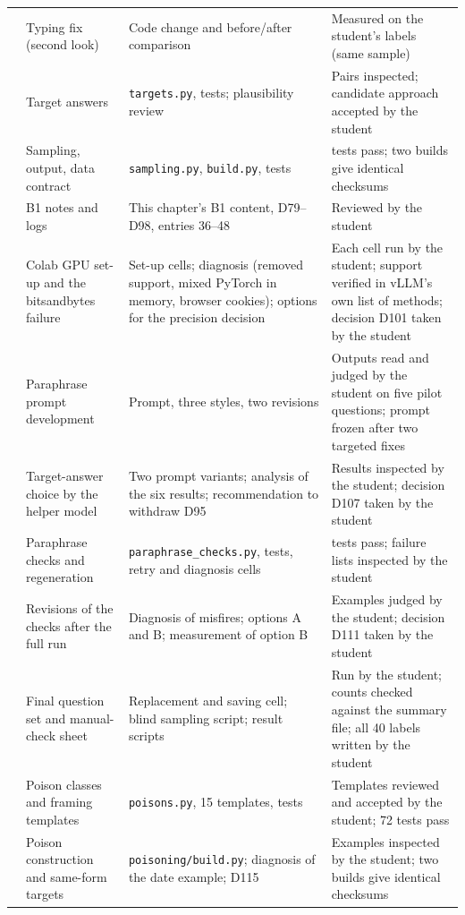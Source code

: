 \documentclass[11pt,a4paper]{report}
\begin{document}
{\begin{longtable}{
  >{\raggedright\arraybackslash}p{0.6cm}
  >{\raggedright\arraybackslash}p{4.4cm}
  >{\raggedright\arraybackslash}p{4.4cm}
  >{\raggedright\arraybackslash}p{4.8cm}}
45 & Typing fix (second look) & Code change and before/after comparison & Measured on the student's labels (same sample) \\
46 & Target answers & \texttt{targets.py}, tests; plausibility review & Pairs inspected; candidate approach accepted by the student \\
47 & Sampling, output, data contract
  & \texttt{sampling.py}, \texttt{build.py}, tests
  & 49 tests pass; two builds give identical checksums \\
48 & B1 notes and logs & This chapter's B1 content, D79--D98, entries 36--48 & Reviewed by the student \\
49 & Colab GPU set-up and the bitsandbytes failure
  & Set-up cells; diagnosis (removed support, mixed PyTorch in memory, browser cookies); options for the precision decision
  & Each cell run by the student; support verified in vLLM's own list of methods; decision D101 taken by the student \\
50 & Paraphrase prompt development
  & Prompt, three styles, two revisions
  & Outputs read and judged by the student on five pilot questions; prompt frozen after two targeted fixes \\
51 & Target-answer choice by the helper model
  & Two prompt variants; analysis of the six results; recommendation to withdraw D95
  & Results inspected by the student; decision D107 taken by the student \\
52 & Paraphrase checks and regeneration
  & \texttt{paraphrase\_checks.py}, tests, retry and diagnosis cells
  & 60 tests pass; failure lists inspected by the student \\
53 & Revisions of the checks after the full run
  & Diagnosis of misfires; options A and B; measurement of option B
  & Examples judged by the student; decision D111 taken by the student \\
54 & Final question set and manual-check sheet
  & Replacement and saving cell; blind sampling script; result scripts
  & Run by the student; counts checked against the summary file; all 40 labels written by the student \\
55 & Poison classes and framing templates
  & \texttt{poisons.py}, 15 templates, tests
  & Templates reviewed and accepted by the student; 72 tests pass \\
56 & Poison construction and same-form targets
  & \texttt{poisoning/build.py}; diagnosis of the date example; D115
  & Examples inspected by the student; two builds give identical checksums \\

\end{longtable}}
\end{document}
